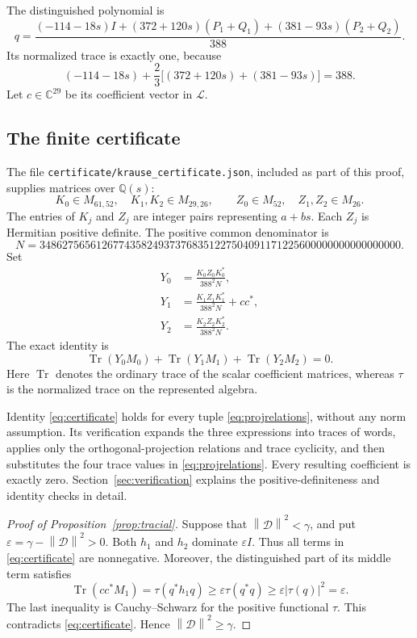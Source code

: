 \documentclass[11pt]{article}
\theoremstyle{definition}\newtheorem{definition}[theorem]{Definition}
\theoremstyle{remark}\newtheorem{remark}[theorem]{Remark}
\newcommand{\C}{\mathbb C}
\newcommand{\Tr}{\operatorname{Tr}}
\newcommand{\norm}[1]{\left\lVert#1\right\rVert}
\newcommand{\Lwords}{\mathcal L}
\begin{document}
The distinguished polynomial is
\begin{equation}\label{eq:q}
 q=\frac{(-114-18s)I+(372+120s)(P_1+Q_1)+(381-93s)(P_2+Q_2)}{388}.
\end{equation}
Its normalized trace is exactly one, because
\[
 (-114-18s)+\frac23\bigl[(372+120s)+(381-93s)\bigr]=388.
\]
Let $c\in\C^{29}$ be its coefficient vector in $\Lwords$.

\subsection{The finite certificate}
The file \texttt{certificate/krause\_certificate.json}, included as part of this proof, supplies matrices over $\mathbb Q(s)$:
\[
 K_0\in M_{61,52},\quad K_1,K_2\in M_{29,26},\qquad
 Z_0\in M_{52},\quad Z_1,Z_2\in M_{26}.
\]
The entries of $K_j$ and $Z_j$ are integer pairs representing $a+bs$. Each $Z_j$ is Hermitian positive definite. The positive common denominator is
\begin{equation}\label{eq:N}
 N=3486275656126774358249373768351227504091171225600000000000000000.
\end{equation}
Set
\begin{align}
 Y_0&=\frac{K_0Z_0K_0^*}{388^2N},\nonumber\\
 Y_1&=\frac{K_1Z_1K_1^*}{388^2N}+cc^*,\label{eq:GramY}\\
 Y_2&=\frac{K_2Z_2K_2^*}{388^2N}.\nonumber
\end{align}
The exact identity is
\begin{equation}\label{eq:certificate}
 \Tr(Y_0M_0)+\Tr(Y_1M_1)+\Tr(Y_2M_2)=0.
\end{equation}
Here $\Tr$ denotes the ordinary trace of the scalar coefficient matrices, whereas $\tau$ is the normalized trace on the represented algebra.

Identity \eqref{eq:certificate} holds for every tuple \eqref{eq:projrelations}, without any norm assumption. Its verification expands the three expressions into traces of words, applies only the orthogonal-projection relations and trace cyclicity, and then substitutes the four trace values in \eqref{eq:projrelations}. Every resulting coefficient is exactly zero. Section~\ref{sec:verification} explains the positive-definiteness and identity checks in detail.

\begin{proof}[Proof of Proposition~\ref{prop:tracial}]
Suppose that $\norm{\mathcal D}^2<\gamma$, and put $\varepsilon=\gamma-\norm{\mathcal D}^2>0$. Both $h_1$ and $h_2$ dominate $\varepsilon I$. Thus all terms in \eqref{eq:certificate} are nonnegative. Moreover, the distinguished part of its middle term satisfies
\[
 \Tr(cc^*M_1)=\tau(q^*h_1q)
 \ge\varepsilon\tau(q^*q)
 \ge\varepsilon|\tau(q)|^2=\varepsilon.
\]
The last inequality is Cauchy--Schwarz for the positive functional $\tau$. This contradicts \eqref{eq:certificate}. Hence $\norm{\mathcal D}^2\ge\gamma$.
\end{proof}
\end{document}
